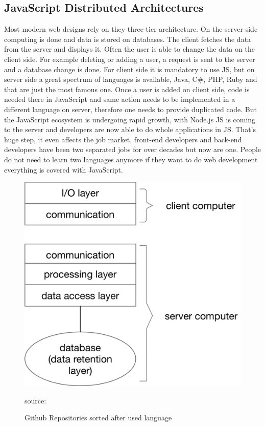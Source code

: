 \newpage

\subsection{JavaScript Distributed Architectures}
Most modern web designs rely on they three-tier architecture. On the server side computing is done and data is stored on databases. The client fetches the data from the server and displays it. Often the user is able to change the data on the client side. For example deleting or adding a user, a request is sent to the server and a database change is done. For client side it is mandatory to use \gls{JS}, but on server side  a great spectrum of languages is available, Java, C#, PHP, Ruby and that are just the most famous one. Once a user is added on client side, code is needed there in JavaScript and same action needs to be implemented in a different language on server, therefore one needs to provide duplicated code. But the JavaScript ecosystem is undergoing rapid growth, with Node.js \gls{JS} is coming to the server and developers are now able to do whole applications in \gls{JS}. That's huge step, it even affects the job market, front-end developers and back-end developers have been two separated jobs for over decades but now are one. People do not need to learn two languages anymore if they want to do web development everything is covered with JavaScript.




\begin{figure}[hb]
	\centering
	\includegraphics[scale=0.5]{bilder/grundlagen/Three-Tier.png}
	\caption{Github Repositories sorted after used language} source:\cite{JS}
	\label{fig:JS}
\end{figure}

